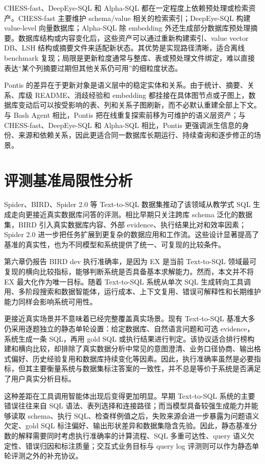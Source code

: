 \documentclass[
    bachelor,
    pdflinks,
]{xjtuthesis}
\begin{document}
CHESS-fast、DeepEye-SQL 和 Alpha-SQL 都在一定程度上依赖预处理或检索资产。CHESS-fast 主要维护 schema/value 相关的检索索引；DeepEye-SQL 构建 value-level 向量数据库；Alpha-SQL 除 embedding 外还生成部分数据库预处理摘要。数据库结构或内容变化后，这些资产可以通过重新构建索引、value vector DB、LSH 结构或摘要文件来适配新状态。其优势是实现路径清晰，适合离线 benchmark 复现；局限是更新粒度通常与整库、表或预处理文件绑定，难以直接表达“某个列摘要过期但其他关系仍可用”的细粒度状态。

Pontis 的差异在于更新对象是语义层中的稳定实体和关系。由于统计、摘要、关系、库级 README、消歧经验和 embedding 都挂接在具体图节点或子图上，数据库变动后可以按受影响的表、列和关系子图刷新，而不必默认重建全部上下文。与 Bash Agent 相比，Pontis 把在线重复探索前移为可维护的语义层资产；与 CHESS-fast、DeepEye-SQL 和 Alpha-SQL 相比，Pontis 更强调派生信息的身份、来源和依赖关系，因此更适合同一数据库长期运行、持续查询和逐步修正的场景。

\chapter{评测基准局限性分析}

Spider、BIRD、Spider 2.0 等 Text-to-SQL 数据集推动了该领域从教学式 SQL 生成走向更接近真实数据库问答的评测。相比早期只关注跨库 schema 泛化的数据集，BIRD 引入真实数据库内容、外部 evidence、执行结果比对和效率因素；Spider 2.0 进一步把任务扩展到更复杂的数据应用和工作流。这些设计显著提高了基准的真实性，也为不同模型和系统提供了统一、可复现的比较条件。

第六章仍报告 BIRD dev 执行准确率，是因为 EX 是当前 Text-to-SQL 领域最可复现的横向比较指标，能够判断系统是否具备基本求解能力。然而，本文并不将 EX 最大化作为唯一目标。随着 Text-to-SQL 系统从单次 SQL 生成转向工具调用、多阶段搜索和数据智能体，运行成本、上下文复用、错误可解释性和长期维护能力同样会影响系统可用性。

更接近真实场景并不意味着已经完整覆盖真实场景。现有 Text-to-SQL 基准大多仍采用逐题独立的静态单轮设置：给定数据库、自然语言问题和可选 evidence，系统生成一条 SQL，再用 gold SQL 或执行结果进行判定。该协议适合排行榜构建和横向比较，却排除了真实数据分析中常见的意图澄清、业务口径协商、输出格式偏好、历史经验复用和数据库持续变化等因素。因此，执行准确率虽然是必要指标，但其主要衡量系统与数据集标注答案的一致性，并不总是等价于系统是否满足了用户真实分析目标。

这种差距在工具调用智能体出现后变得更加明显。早期 Text-to-SQL 系统的主要错误往往来自 SQL 语法、表列选择和连接路径；而当模型具备较强生成能力并能够读取 schema、执行 SQL、检查样例值之后，失败来源会进一步暴露为问题语义欠定、gold SQL 标注偏好、输出形状差异和数据集隐含先验。因此，静态基准分数的解释需要同时考虑执行准确率的计算流程、SQL 多重可达性、query 语义欠定性、错误归因和标注质量；交互式业务目标与 query log 评测则可以作为静态单轮评测之外的补充协议。
\end{document}

